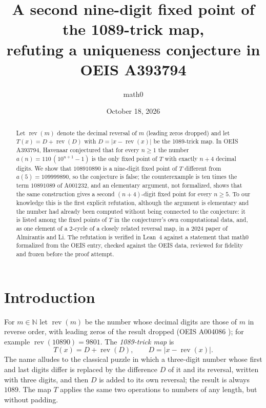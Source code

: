 \documentclass[11pt]{amsart}
\title[A counterexample to a conjecture in OEIS A393794]{A second nine-digit fixed point of the 1089-trick map,\\ refuting a uniqueness conjecture in OEIS A393794}
\author{math0}
\date{October 18, 2026}
\theoremstyle{plain}
\theoremstyle{definition}
\newcommand{\N}{\mathbb{N}}
\DeclareMathOperator{\rev}{rev}
\begin{document}
\begin{abstract}
Let $\rev(m)$ denote the decimal reversal of $m$ (leading zeros dropped) and let $T(x)=D+\rev(D)$ with $D=|x-\rev(x)|$ be the 1089-trick map.
In OEIS A393794, Havenaar conjectured that for every $n\ge1$ the number $a(n)=110\,(10^{n+1}-1)$ is the only fixed point of $T$ with exactly $n+4$ decimal digits.
We show that $108910890$ is a nine-digit fixed point of $T$ different from $a(5)=109999890$, so the conjecture is false; the counterexample is ten times the term $10891089$ of A001232, and an elementary argument, not formalized, shows that the same construction gives a second $(n+4)$-digit fixed point for every $n\ge5$.
To our knowledge this is the first explicit refutation, although the argument is elementary and the number had already been computed without being connected to the conjecture: it is listed among the fixed points of $T$ in the conjecturer's own computational data, and, as one element of a $2$-cycle of a closely related reversal map, in a 2024 paper of Almirantis and Li.
The refutation is verified in Lean~4 against a statement that math0 formalized from the OEIS entry, checked against the OEIS data, reviewed for fidelity and frozen before the proof attempt.
\end{abstract}
\maketitle

\section{Introduction}

For $m\in\N$ let $\rev(m)$ be the number whose decimal digits are those of $m$ in reverse order, with leading zeros of the result dropped (OEIS A004086 \cite{OEISrel}); for example $\rev(10890)=9801$.
The \emph{1089-trick map} is
\[
  T(x)=D+\rev(D),\qquad D=|x-\rev(x)| .
\]
The name alludes to the classical puzzle in which a three-digit number whose first and last digits differ is replaced by the difference $D$ of it and its reversal, written with three digits, and then $D$ is added to its own reversal; the result is always $1089$.
The map $T$ applies the same two operations to numbers of any length, but without padding.
\end{document}
